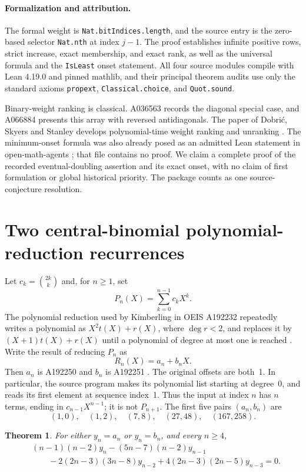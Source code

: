 \documentclass[11pt]{article}
\newtheorem{theorem}{Theorem}[section]
\begin{document}
\paragraph{Formalization and attribution.}
The formal weight is \texttt{Nat.bitIndices.length}, and the source
entry is the zero-based selector \texttt{Nat.nth} at index $j-1$.
The proof establishes infinite positive rows, strict increase, exact
membership, and exact rank, as well as the universal formula and the
\texttt{IsLeast} onset statement. All four source modules compile with
Lean 4.19.0 and pinned mathlib, and their principal theorem audits use
only the standard axioms \texttt{propext}, \texttt{Classical.choice},
and \texttt{Quot.sound}.

Binary-weight ranking is classical. A036563 records the diagonal
special case, and A066884 presents this array with reversed
antidiagonals. The paper of Dobri\'c, Skyers and Stanley develops
polynomial-time weight ranking and unranking \cite{dobric2016}.
The minimum-onset formula was also already posed as an admitted Lean
statement in open-math-agents \cite{oma067576}; that file contains no
proof. We claim a complete proof of the recorded eventual-doubling
assertion and its exact onset, with no claim of first formulation or
global historical priority. The package counts as one source-conjecture
resolution.


\section{Two central-binomial polynomial-reduction recurrences}
\label{sec:a192250}

Let $c_k=\binom{2k}{k}$ and, for $n\geq 1$, set
\[
 P_n(X)=\sum_{k=0}^{n-1}c_kX^k.
\]
The polynomial reduction used by Kimberling in OEIS A192232 repeatedly
writes a polynomial as $X^2t(X)+r(X)$, where $\deg r<2$, and replaces it by
$(X+1)t(X)+r(X)$ until a polynomial of degree at most one is reached
\cite{OEISA192232}. Write the result of reducing $P_n$ as
\[
 R_n(X)=a_n+b_nX.
\]
Then $a_n$ is A192250 and $b_n$ is A192251
\cite{OEISA192250,OEISA192251}. The original offsets are both~1.
In particular, the source program makes its polynomial list starting at
degree~0, and reads its first element at sequence index~1. Thus the input
at index $n$ has $n$ terms, ending in $c_{n-1}X^{n-1}$; it is not $P_{n+1}$.
The first five pairs $(a_n,b_n)$ are
\[
(1,0),\quad(1,2),\quad(7,8),\quad(27,48),\quad(167,258).
\]

\begin{theorem}
For either $y_n=a_n$ or $y_n=b_n$, and every $n\geq4$,
\begin{equation}
\label{eq:a192250-mathar}
\begin{split}
 &(n-1)(n-2)y_n-(5n-7)(n-2)y_{n-1}\\
 &\qquad{}-2(2n-3)(3n-8)y_{n-2}
       +4(2n-3)(2n-5)y_{n-3}=0.
\end{split}
\end{equation}
\end{theorem}
\end{document}
